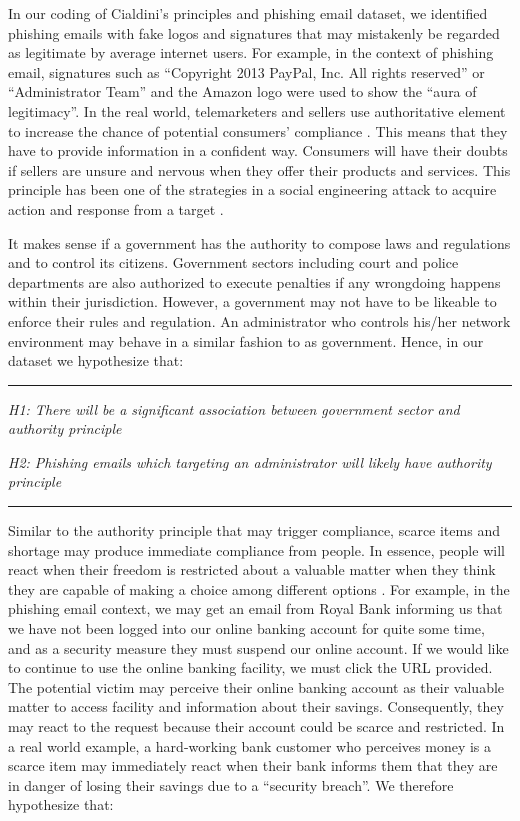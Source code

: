 In our coding of Cialdini\textquoteright s principles and phishing
email dataset, we identified phishing emails with fake logos and signatures
that may mistakenly be regarded as legitimate by average internet
users. For example, in the context of phishing email, signatures such
as \textquotedblleft Copyright 2013 PayPal, Inc. All rights reserved\textquotedblright{}
or \textquotedblleft Administrator Team\textquotedblright{} and the
Amazon logo were used to show the \textquotedblleft aura of legitimacy\textquotedblright .
In the real world, telemarketers and sellers use authoritative element
to increase the chance of potential consumers' compliance \cite{telemarket:2013}.
This means that they have to provide information in a confident way.
Consumers will have their doubts if sellers are unsure and nervous
when they offer their products and services. This principle has been
one of the strategies in a social engineering attack to acquire action
and response from a target \cite{npdn:2013}.

It makes sense if a government has the authority to compose laws and
regulations and to control its citizens. Government sectors including
court and police departments are also authorized to execute penalties
if any wrongdoing happens within their jurisdiction. However, a government
may not have to be likeable to enforce their rules and regulation.
An administrator who controls his/her network environment may behave
in a similar fashion to as government. Hence, in our dataset we hypothesize
that:

\rule[0.5ex]{1\columnwidth}{1pt}

\textit{H1: There will be a significant association between government
sector and authority principle}

\textit{H2: Phishing emails which targeting an administrator will
likely have authority principle }

\rule[0.5ex]{1\columnwidth}{1pt}

Similar to the authority principle that may trigger compliance, scarce
items and shortage may produce immediate compliance from people. In
essence, people will react when their freedom is restricted about
a valuable matter when they think they are capable of making a choice
among different options \cite{pennebaker1976american}. For example,
in the phishing email context, we may get an email from Royal Bank
informing us that we have not been logged into our online banking
account for quite some time, and as a security measure they must suspend
our online account. If we would like to continue to use the online
banking facility, we must click the URL provided. The potential victim
may perceive their online banking account as their valuable matter
to access facility and information about their savings. Consequently,
they may react to the request because their account could be scarce
and restricted. In a real world example, a hard-working bank customer
who perceives money is a scarce item may immediately react when their
bank informs them that they are in danger of losing their savings
due to a \textquotedblleft security breach\textquotedblright . We
therefore hypothesize that:

